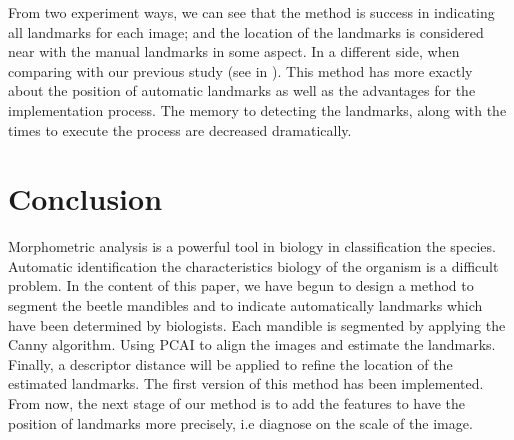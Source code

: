 \documentclass[twoside,twocolumn,10pt]{article}
\begin{document}
From two experiment ways, we can see that the method is success in
indicating all landmarks for each image; and the location of the
landmarks is considered near with the manual landmarks in some
aspect. In a different side, when comparing with our previous study (see in
\cite{leestimating}). This method has more exactly about the position of
automatic landmarks as well as the advantages for the implementation
process. The memory to detecting the landmarks, along with the times
to execute the process are decreased dramatically.

\section{Conclusion}
Morphometric analysis is a powerful tool in biology in classification
the species. Automatic identification the characteristics biology of
the organism is a difficult problem. In the content of this paper, we
have begun to design a method to segment the beetle mandibles and to
indicate automatically landmarks which have been determined by
biologists. Each mandible is segmented by applying the Canny
algorithm. Using PCAI to align the images and estimate the
landmarks. Finally, a descriptor distance will be applied to refine the
location of the estimated landmarks. The first version of this method
has been implemented. From now, the next stage of our method is to add
the features to have the position of landmarks more precisely, i.e diagnose on the scale of the image.




\end{document}
